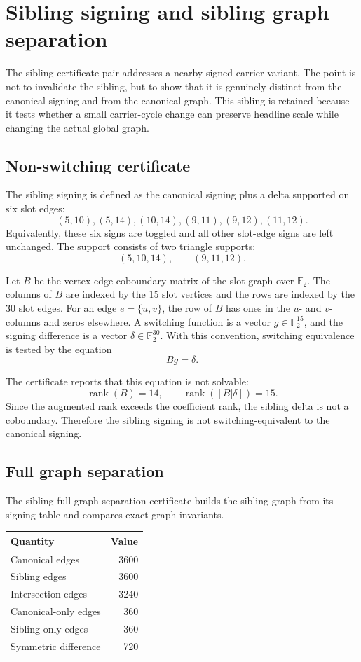 \section{Sibling signing and sibling graph separation}

The sibling certificate pair addresses a nearby signed carrier variant. The point is not to invalidate the sibling, but to show that it is genuinely distinct from the canonical signing and from the canonical graph. This sibling is retained because it tests whether a small carrier-cycle change can preserve headline scale while changing the actual global graph.

\subsection{Non-switching certificate}

The sibling signing is defined as the canonical signing plus a delta supported on six slot edges:
\[
(5,10),(5,14),(10,14),(9,11),(9,12),(11,12).
\]
Equivalently, these six signs are toggled and all other slot-edge signs are left unchanged. The support consists of two triangle supports:
\[
(5,10,14),\qquad (9,11,12).
\]

Let \(B\) be the vertex-edge coboundary matrix of the slot graph over \(\mathbb F_2\). The columns of \(B\) are indexed by the 15 slot vertices and the rows are indexed by the 30 slot edges. For an edge \(e=\{u,v\}\), the row of \(B\) has ones in the \(u\)- and \(v\)-columns and zeros elsewhere. A switching function is a vector \(g\in\mathbb F_2^{15}\), and the signing difference is a vector \(\delta\in\mathbb F_2^{30}\). With this convention, switching equivalence is tested by the equation
\[
Bg=\delta.
\]

The certificate reports that this equation is not solvable:
\[
\operatorname{rank}(B)=14,
\qquad
\operatorname{rank}([B|\delta])=15.
\]
Since the augmented rank exceeds the coefficient rank, the sibling delta is not a coboundary. Therefore the sibling signing is not switching-equivalent to the canonical signing.

\subsection{Full graph separation}

The sibling full graph separation certificate builds the sibling graph from its signing table and compares exact graph invariants.

\begin{center}
\begin{tabular}{lr}
\toprule
Quantity & Value \\
\midrule
Canonical edges & 3600 \\
Sibling edges & 3600 \\
Intersection edges & 3240 \\
Canonical-only edges & 360 \\
Sibling-only edges & 360 \\
Symmetric difference & 720 \\
\bottomrule
\end{tabular}
\end{center}

